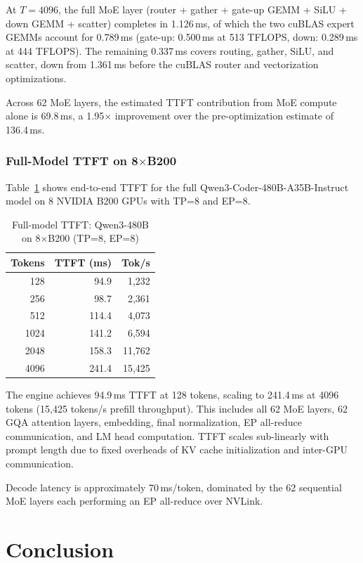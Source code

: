 \documentclass[sigplan,screen]{acmart}
\begin{document}
At $T{=}4096$, the full MoE layer (router + gather + gate-up GEMM + SiLU + down GEMM + scatter) completes in 1.126\,ms, of which the two cuBLAS expert GEMMs account for 0.789\,ms (gate-up: 0.500\,ms at 513 TFLOPS, down: 0.289\,ms at 444 TFLOPS). The remaining 0.337\,ms covers routing, gather, SiLU, and scatter, down from 1.361\,ms before the cuBLAS router and vectorization optimizations.

Across 62 MoE layers, the estimated TTFT contribution from MoE compute alone is 69.8\,ms, a 1.95$\times$ improvement over the pre-optimization estimate of 136.4\,ms.

\subsubsection{Full-Model TTFT on 8$\times$B200}

Table~\ref{tab:moe-ttft} shows end-to-end TTFT for the full Qwen3-Coder-480B-A35B-Instruct model on 8 NVIDIA B200 GPUs with TP=8 and EP=8.

\begin{table}[h]
  \caption{Full-model TTFT: Qwen3-480B on 8$\times$B200 (TP=8, EP=8)}
  \label{tab:moe-ttft}
  \small
  \begin{tabular}{rrr}
    \toprule
    Tokens & TTFT (ms) & Tok/s \\
    \midrule
    128  &  94.9 &  1{,}232 \\
    256  &  98.7 &  2{,}361 \\
    512  & 114.4 &  4{,}073 \\
    1024 & 141.2 &  6{,}594 \\
    2048 & 158.3 & 11{,}762 \\
    4096 & 241.4 & 15{,}425 \\
    \bottomrule
  \end{tabular}
\end{table}

The engine achieves 94.9\,ms TTFT at 128 tokens, scaling to 241.4\,ms at 4096 tokens (15{,}425 tokens/s prefill throughput). This includes all 62 MoE layers, 62 GQA attention layers, embedding, final normalization, EP all-reduce communication, and LM head computation. TTFT scales sub-linearly with prompt length due to fixed overheads of KV cache initialization and inter-GPU communication.

Decode latency is approximately 70\,ms/token, dominated by the 62 sequential MoE layers each performing an EP all-reduce over NVLink.

\section{Conclusion}
\end{document}
